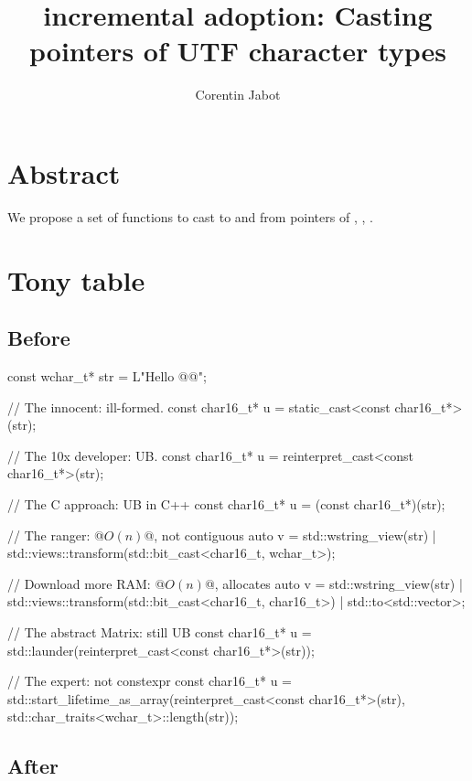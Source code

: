 \documentclass{wg21}
\title{\tcode{charN\_t} incremental adoption: Casting pointers of UTF character types}
\author{Corentin Jabot}{corentin.jabot@gmail.com}
\begin{document}
\maketitle

\section{Abstract}

We propose a set of functions to cast to and from pointers of , , .



\section{Tony table}
\subsection{Before}
\begin{colorblock}

const wchar_t* str = L"Hello @@";

// The innocent: ill-formed.
const char16_t*  u = static_cast<const char16_t*>(str);

// The 10x developer: UB.
const char16_t*  u = reinterpret_cast<const char16_t*>(str);

// The C approach: UB in C++
const char16_t*  u = (const char16_t*)(str);

// The ranger: @$O(n)$@, not contiguous
auto v = std::wstring_view(str) | std::views::transform(std::bit_cast<char16_t, wchar_t>);

// Download more RAM: @$O(n)$@, allocates
auto v = std::wstring_view(str)
    | std::views::transform(std::bit_cast<char16_t, char16_t>) | std::to<std::vector>;

// The abstract Matrix: still UB
const char16_t* u =  std::launder(reinterpret_cast<const char16_t*>(str));

// The expert: not constexpr
const char16_t* u =  std::start_lifetime_as_array(reinterpret_cast<const char16_t*>(str),
                                                  std::char_traits<wchar_t>::length(str));

\end{colorblock}
\pagebreak
\subsection{After}
\end{document}
